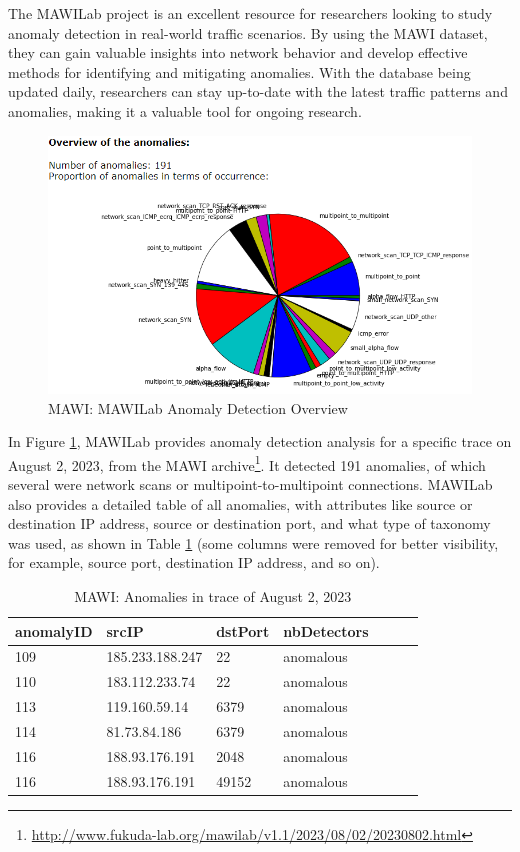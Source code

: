 \documentclass[sigconf,authorversion,nonacm]{acmart}
\begin{document}
The MAWILab project is an excellent resource for researchers looking to study anomaly detection in real-world traffic scenarios. By using the MAWI dataset, they can gain valuable insights into network behavior and develop effective methods for identifying and mitigating anomalies. With the database being updated daily, researchers can stay up-to-date with the latest traffic patterns and anomalies, making it a valuable tool for ongoing research.

\begin{figure}
        \includegraphics[width=\linewidth]{MAWI/MAWILab.PNG}
        \caption{MAWI: MAWILab Anomaly Detection Overview}
        \label{MAWI: MAWILab Anomaly Detection Overview}
\end{figure}

In Figure \ref{MAWI: MAWILab Anomaly Detection Overview}, MAWILab provides anomaly detection analysis for a specific trace on August 2, 2023, from the MAWI archive\footnote{\url{http://www.fukuda-lab.org/mawilab/v1.1/2023/08/02/20230802.html}}. It detected 191 anomalies, of which several were network scans or multipoint-to-multipoint connections. MAWILab also provides a detailed table of all anomalies, with attributes like source or destination IP address, source or destination port, and what type of taxonomy was used, as shown in Table \ref{anomaly} (some columns were removed for better visibility, for example, source port, destination IP address, and so on).

\begin{table}[!ht]
    \centering
    \caption{MAWI: Anomalies in trace of August 2, 2023}
    \label{anomaly}
    \begin{tabular}{|l|l|l|l|l|l|l|}
    \hline
        anomalyID &  srcIP & dstPort & nbDetectors \\ \hline
        109 & 185.233.188.247 & 22 & anomalous \\ \hline
        110 & 183.112.233.74 & 22 & anomalous \\ \hline
        113 & 119.160.59.14 & 6379 & anomalous \\ \hline
        114 & 81.73.84.186 & 6379 & anomalous \\ \hline
        116 & 188.93.176.191 & 2048 & anomalous \\ \hline
        116 & 188.93.176.191 & 49152 & anomalous \\ \hline
    \end{tabular}
\end{table}
\end{document}
